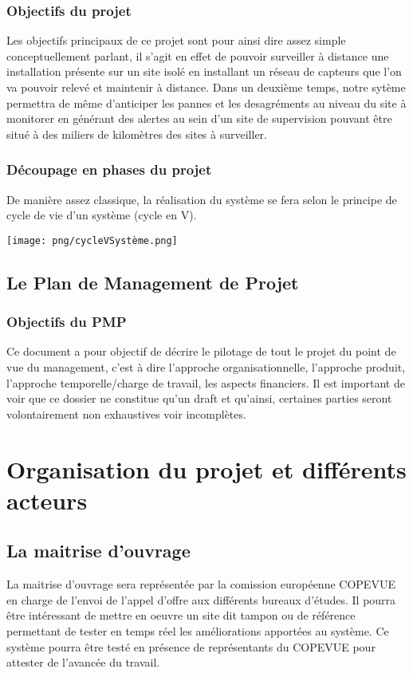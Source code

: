 \subsubsection{Objectifs du projet}
Les objectifs principaux de ce projet sont pour ainsi dire assez simple conceptuellement parlant, il s'agit en effet de pouvoir surveiller à distance une installation présente sur un site isolé en installant un réseau de capteurs que l'on va pouvoir relevé et maintenir à distance. Dans un deuxième temps, notre sytème permettra de même d'anticiper les pannes et les desagréments au niveau du site à monitorer en générant des alertes au sein d'un site de supervision pouvant être situé à des miliers de kilomètres des sites à surveiller.

\subsubsection{Découpage en phases du projet}
De manière assez classique, la réalisation du système se fera selon le principe de cycle de vie d'un système (cycle en V).
\begin {center}
\texttt{[image: png/cycleVSystème.png]}
\end {center}

\subsection{Le Plan de Management de Projet}
\subsubsection{Objectifs du PMP}
Ce document a pour objectif de décrire le pilotage de  tout le projet du point de vue du management, c'est à dire l'approche organisationnelle, l'approche produit, l'approche temporelle/charge de travail, les aspects financiers. Il est important de voir que ce dossier ne constitue qu'un draft et qu'ainsi, certaines parties seront volontairement non exhaustives voir incomplètes.

\section{Organisation du projet et différents acteurs}
\subsection{La maitrise d'ouvrage}
La maitrise d'ouvrage sera représentée par la comission européenne COPEVUE en charge de l'envoi de l'appel d'offre aux différents bureaux d'études. Il pourra être intéressant de mettre en oeuvre un site dit tampon ou de référence permettant de tester en temps réel les améliorations apportées au système. Ce système pourra être testé en présence de représentants du
 COPEVUE pour attester de l'avancée du travail.
